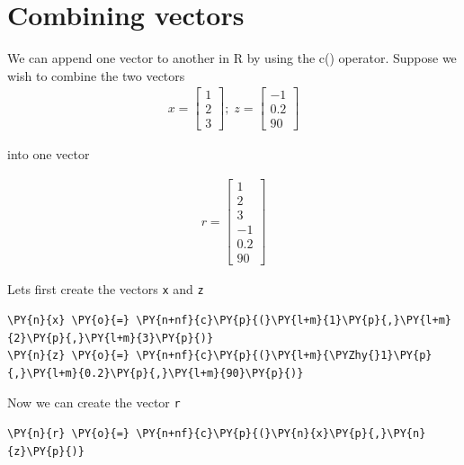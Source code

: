     \hypertarget{combining-vectors}{%
\section{Combining vectors}\label{combining-vectors}}

We can append one vector to another in R by using the c() operator.
Suppose we wish to combine the two vectors \begin{align}
    x = \begin{bmatrix}
        1\\
        2\\
        3
        \end{bmatrix}; \;
    z = \begin{bmatrix}
        -1\\
        0.2\\
        90
        \end{bmatrix}
\end{align}

into one vector

\begin{align}
    r = \begin{bmatrix}
        1\\
        2\\
        3\\
        -1\\
        0.2\\
        90
        \end{bmatrix}
\end{align}

Lets first create the vectors \texttt{x} and \texttt{z}

    \begin{tcolorbox}[breakable, size=fbox, boxrule=1pt, pad at break*=1mm,colback=cellbackground, colframe=cellborder]
\begin{Verbatim}[commandchars=\\\{\}]
\PY{n}{x} \PY{o}{=} \PY{n+nf}{c}\PY{p}{(}\PY{l+m}{1}\PY{p}{,}\PY{l+m}{2}\PY{p}{,}\PY{l+m}{3}\PY{p}{)}
\PY{n}{z} \PY{o}{=} \PY{n+nf}{c}\PY{p}{(}\PY{l+m}{\PYZhy{}1}\PY{p}{,}\PY{l+m}{0.2}\PY{p}{,}\PY{l+m}{90}\PY{p}{)}
\end{Verbatim}
\end{tcolorbox}

    Now we can create the vector \texttt{r}

    \begin{tcolorbox}[breakable, size=fbox, boxrule=1pt, pad at break*=1mm,colback=cellbackground, colframe=cellborder]
\begin{Verbatim}[commandchars=\\\{\}]
\PY{n}{r} \PY{o}{=} \PY{n+nf}{c}\PY{p}{(}\PY{n}{x}\PY{p}{,}\PY{n}{z}\PY{p}{)}
\end{Verbatim}
\end{tcolorbox}

